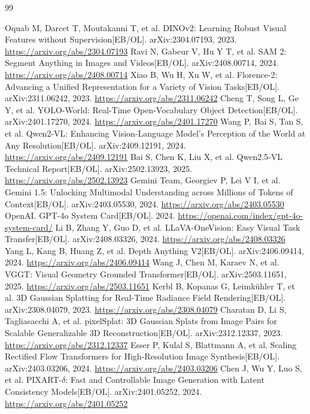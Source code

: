 \documentclass[UTF8,a4paper,12pt]{ctexart}
\begin{document}
\newpage
\begin{thebibliography}{99}
 Oquab M, Darcet T, Moutakanni T, et al. DINOv2: Learning Robust Visual Features without Supervision[EB/OL]. arXiv:2304.07193, 2023. \url{https://arxiv.org/abs/2304.07193}
 Ravi N, Gabeur V, Hu Y T, et al. SAM 2: Segment Anything in Images and Videos[EB/OL]. arXiv:2408.00714, 2024. \url{https://arxiv.org/abs/2408.00714}
 Xiao B, Wu H, Xu W, et al. Florence-2: Advancing a Unified Representation for a Variety of Vision Tasks[EB/OL]. arXiv:2311.06242, 2023. \url{https://arxiv.org/abs/2311.06242}
 Cheng T, Song L, Ge Y, et al. YOLO-World: Real-Time Open-Vocabulary Object Detection[EB/OL]. arXiv:2401.17270, 2024. \url{https://arxiv.org/abs/2401.17270}
 Wang P, Bai S, Tan S, et al. Qwen2-VL: Enhancing Vision-Language Model's Perception of the World at Any Resolution[EB/OL]. arXiv:2409.12191, 2024. \url{https://arxiv.org/abs/2409.12191}
 Bai S, Chen K, Liu X, et al. Qwen2.5-VL Technical Report[EB/OL]. arXiv:2502.13923, 2025. \url{https://arxiv.org/abs/2502.13923}
 Gemini Team, Georgiev P, Lei V I, et al. Gemini 1.5: Unlocking Multimodal Understanding across Millions of Tokens of Context[EB/OL]. arXiv:2403.05530, 2024. \url{https://arxiv.org/abs/2403.05530}
 OpenAI. GPT-4o System Card[EB/OL]. 2024. \url{https://openai.com/index/gpt-4o-system-card/}
 Li B, Zhang Y, Guo D, et al. LLaVA-OneVision: Easy Visual Task Transfer[EB/OL]. arXiv:2408.03326, 2024. \url{https://arxiv.org/abs/2408.03326}
 Yang L, Kang B, Huang Z, et al. Depth Anything V2[EB/OL]. arXiv:2406.09414, 2024. \url{https://arxiv.org/abs/2406.09414}
 Wang J, Chen M, Karaev N, et al. VGGT: Visual Geometry Grounded Transformer[EB/OL]. arXiv:2503.11651, 2025. \url{https://arxiv.org/abs/2503.11651}
 Kerbl B, Kopanas G, Leimkühler T, et al. 3D Gaussian Splatting for Real-Time Radiance Field Rendering[EB/OL]. arXiv:2308.04079, 2023. \url{https://arxiv.org/abs/2308.04079}
 Charatan D, Li S, Tagliasacchi A, et al. pixelSplat: 3D Gaussian Splats from Image Pairs for Scalable Generalizable 3D Reconstruction[EB/OL]. arXiv:2312.12337, 2023. \url{https://arxiv.org/abs/2312.12337}
 Esser P, Kulal S, Blattmann A, et al. Scaling Rectified Flow Transformers for High-Resolution Image Synthesis[EB/OL]. arXiv:2403.03206, 2024. \url{https://arxiv.org/abs/2403.03206}
 Chen J, Wu Y, Luo S, et al. PIXART-$\delta$: Fast and Controllable Image Generation with Latent Consistency Models[EB/OL]. arXiv:2401.05252, 2024. \url{https://arxiv.org/abs/2401.05252}

\end{thebibliography}
\end{document}
